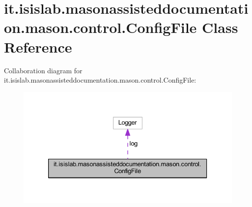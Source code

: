 \hypertarget{classit_1_1isislab_1_1masonassisteddocumentation_1_1mason_1_1control_1_1_config_file}{\section{it.\-isislab.\-masonassisteddocumentation.\-mason.\-control.\-Config\-File Class Reference}
\label{classit_1_1isislab_1_1masonassisteddocumentation_1_1mason_1_1control_1_1_config_file}
}


Collaboration diagram for it.\-isislab.\-masonassisteddocumentation.\-mason.\-control.\-Config\-File\-:\nopagebreak
\begin{figure}[H]
\begin{center}
\leavevmode
\includegraphics[width=333pt]{classit_1_1isislab_1_1masonassisteddocumentation_1_1mason_1_1control_1_1_config_file__coll__graph}
\end{center}
\end{figure}
